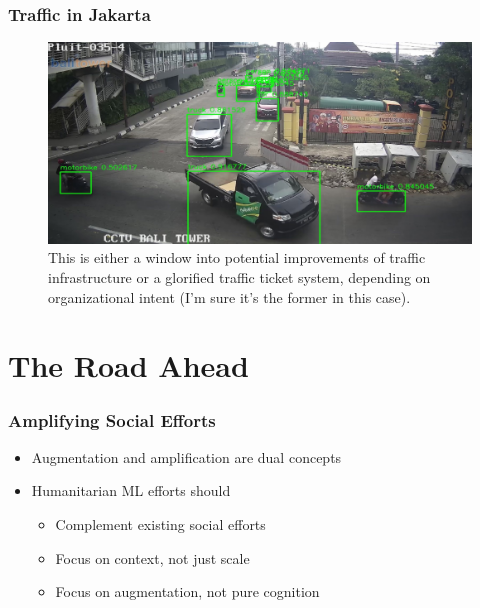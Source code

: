 \documentclass[10pt,mathserif]{beamer}
\begin{document}
\begin{frame}
  \frametitle{Traffic in Jakarta}
  \begin{figure}[ht]
    \centering
    \includegraphics[width=0.9\paperwidth]{figures/jakarta_traffic}
    \caption{This is either a window into potential improvements of traffic
      infrastructure or a glorified traffic ticket system, depending on
      organizational intent (I'm sure it's the former in this case).
       \citep{caldeira2018improving} \label{fig:jakarta} }
  \end{figure}
\end{frame}

\section{The Road Ahead}
\label{sec:label}

\begin{frame}
  \frametitle{Amplifying Social Efforts}
  \begin{itemize}
  \item Augmentation and amplification are dual concepts
  \item Humanitarian ML efforts should
    \begin{itemize}
    \item Complement existing social efforts
    \item Focus on context, not just scale
    \item Focus on augmentation, not pure cognition
    \end{itemize}
  \end{itemize}
\end{frame}
\end{document}
